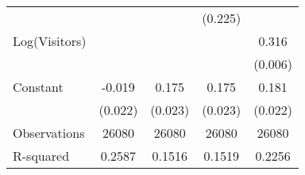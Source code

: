 {\begin{tabular}{l*{4}{c}}
                    &                     &                     &     (0.225)         &                     \\
Log(Visitors)       &                     &                     &                     &       0.316\sym{***}\\
                    &                     &                     &                     &     (0.006)         \\
Constant            &      -0.019         &       0.175\sym{***}&       0.175\sym{***}&       0.181\sym{***}\\
                    &     (0.022)         &     (0.023)         &     (0.023)         &     (0.022)         \\
\midrule
Observations        &       26080         &       26080         &       26080         &       26080         \\
R-squared           &      0.2587         &      0.1516         &      0.1519         &      0.2256         \\
\bottomrule
\end{tabular}
}
